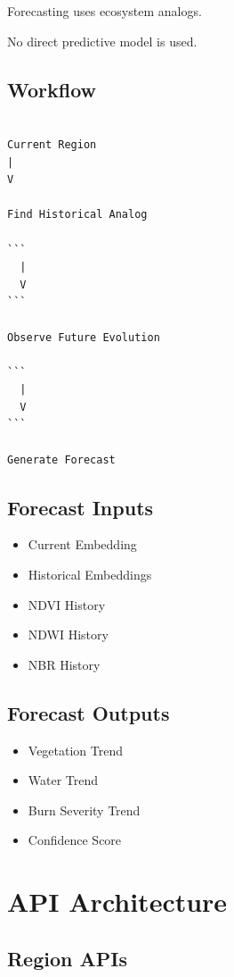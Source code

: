 \documentclass[11pt,a4paper]{article}
\begin{document}
Forecasting uses ecosystem analogs.

No direct predictive model is used.

\subsection{Workflow}

\begin{verbatim}

Current Region
|
V

Find Historical Analog

```
  |
  V
```

Observe Future Evolution

```
  |
  V
```

Generate Forecast

\end{verbatim}

\subsection{Forecast Inputs}

\begin{itemize}
\item Current Embedding
\item Historical Embeddings
\item NDVI History
\item NDWI History
\item NBR History
\end{itemize}

\subsection{Forecast Outputs}

\begin{itemize}
\item Vegetation Trend
\item Water Trend
\item Burn Severity Trend
\item Confidence Score
\end{itemize}

\section{API Architecture}

\subsection{Region APIs}
\end{document}
